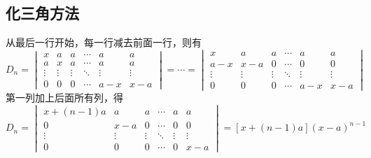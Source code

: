 \subsection{化三角方法}
\begin{solution}
    从最后一行开始，每一行减去前面一行，则有
    \[
        D_n =
        \begin{vmatrix}
            x      & a      & a      & \cdots & a      & a      \\
            a      & x      & a      & \cdots & a      & a      \\
            \vdots & \vdots & \vdots & \ddots & \vdots & \vdots \\
            0      & 0      & 0      & \cdots & a-x    & x-a
        \end{vmatrix}
        =
        \cdots
        =
        \begin{vmatrix}
            x      & a      & a      & \cdots & a      & a      \\
            a-x    & x-a    & 0      & \cdots & 0      & 0      \\
            \vdots & \vdots & \vdots & \ddots & \vdots & \vdots \\
            0      & 0      & 0      & \cdots & a-x    & x-a
        \end{vmatrix}
    \]
    第一列加上后面所有列，得
    \[
        D_n =
        \begin{vmatrix}
            x + (n-1)a & a      & a      & \cdots & a      & a      \\
            0          & x-a    & 0      & \cdots & 0      & 0      \\
            \vdots     & \vdots & \vdots & \ddots & \vdots & \vdots \\
            0          & 0      & 0      & \cdots & 0      & x-a
        \end{vmatrix}
        =
        [x+(n-1)a](x-a)^{n-1}
    \]
\end{solution}
